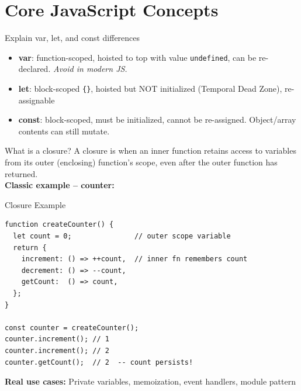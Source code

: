 \documentclass[12pt,a4paper]{article}
\begin{document}
\section{Core JavaScript Concepts}

\begin{qbox}{Explain var, let, and const differences}
\begin{itemize}[leftmargin=1.5em, itemsep=4pt]
    \item \textbf{var}: function-scoped, hoisted to top with value \texttt{undefined}, can be re-declared. \textit{Avoid in modern JS.}
    \item \textbf{let}: block-scoped \texttt{\{\}}, hoisted but NOT initialized (Temporal Dead Zone), re-assignable
    \item \textbf{const}: block-scoped, must be initialized, cannot be re-assigned. Object/array contents can still mutate.
\end{itemize}
\end{qbox}

\begin{qbox}{What is a closure?}
A closure is when an inner function retains access to variables from its outer (enclosing) function's scope, even after the outer function has returned.\\[0.3cm]
\textbf{Classic example -- counter:}
\begin{codebox}{Closure Example}
\begin{lstlisting}
function createCounter() {
  let count = 0;               // outer scope variable
  return {
    increment: () => ++count,  // inner fn remembers count
    decrement: () => --count,
    getCount:  () => count,
  };
}

const counter = createCounter();
counter.increment(); // 1
counter.increment(); // 2
counter.getCount();  // 2  -- count persists!
\end{lstlisting}
\end{codebox}
\textbf{Real use cases:} Private variables, memoization, event handlers, module pattern
\end{qbox}
\end{document}
